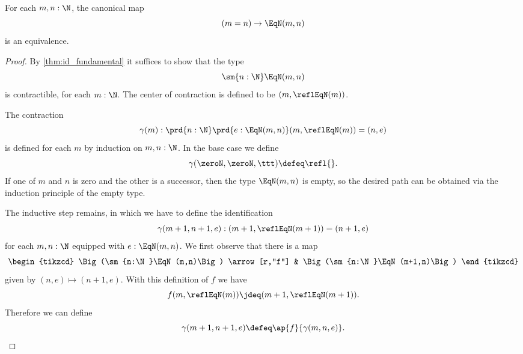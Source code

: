 \begin{thm}\label{thm:eq_nat}
  For each $m,n:\N$, the canonical map
  \begin{equation*}
    (m=n)\to \EqN(m,n)
  \end{equation*}
  is an equivalence.
\end{thm}

\begin{proof}
  By \cref{thm:id_fundamental} it suffices to show that the type
  \begin{equation*}
    \sm{n:\N}\EqN(m,n)
  \end{equation*}
  is contractible, for each $m:\N$. The center of contraction is defined to be $(m,\reflEqN(m))$.

  The contraction
  \begin{equation*}
    \gamma(m):\prd{n:\N}\prd{e:\EqN(m,n)}(m,\reflEqN(m))=(n,e)
  \end{equation*}
  is defined for each $m$ by induction on $m,n:\N$. In the base case we define
  \begin{equation*}
    \gamma(\zeroN,\zeroN,\ttt)\defeq \refl{}.
  \end{equation*}
  If one of $m$ and $n$ is zero and the other is a successor, then the type $\EqN(m,n)$ is empty, so the desired path can be obtained via the induction principle of the empty type.

  The inductive step remains, in which we have to define the identification
  \begin{equation*}
    \gamma(m+1,n+1,e):(m+1,\reflEqN(m+1))=(n+1,e)
  \end{equation*}
  for each $m,n:\N$ equipped with $e:\EqN(m,n)$. We first observe that there is a map
  \begin{equation*}
    \begin{tikzcd}
      \Big(\sm{n:\N}\EqN(m,n)\Big) \arrow[r,"f"] & \Big(\sm{n:\N}\EqN(m+1,n)\Big)
    \end{tikzcd}
  \end{equation*}
  given by $(n,e)\mapsto (n+1,e)$. With this definition of $f$ we have
  \begin{equation*}
    f(m,\reflEqN(m))\jdeq (m+1,\reflEqN(m+1)).
  \end{equation*}
  Therefore we can define
  \begin{equation*}
    \gamma(m+1,n+1,e)\defeq \ap{f}{\gamma(m,n,e)}.\qedhere
  \end{equation*}
\end{proof}


